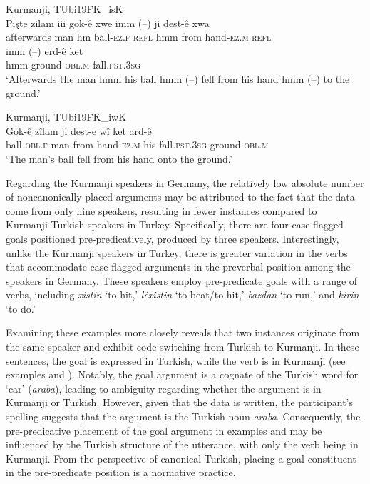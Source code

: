 \ea \label{ex:key:62} Kurmanji, TUbi19FK\_isK \\
\gll Pişte    zilam   iii   gok-ê    xwe imm (--)   ji   dest-ê     xwa\\
afterwards  man  hm  ball-\textsc{ez.f}  \textsc{refl}  hmm  {} from  hand\textsc{-ez.m}  \textsc{refl} \\
\gll imm (--)   erd-ê       ket \\
hmm   {} ground-\textsc{obl.m}    fall.\textsc{pst.3sg}\\
\glt ‘Afterwards the man hmm his ball hmm (--) fell from his hand hmm (--) to the ground.’ 
\z


\ea
  \label{ex:key:63} Kurmanji, TUbi19FK\_iwK \\
\gll Gok-ê     zîlam   ji   dest-e    wî   ket     ard-ê \\
ball-\textsc{obl.f}  man  from  hand\textsc{-ez.m}  his  fall.\textsc{pst.3sg}  ground-\textsc{obl.m}\\
\glt ‘The man's ball fell from his hand onto the ground.’ 
  \z

Regarding the Kurmanji speakers in Germany, the relatively low absolute number of noncanonically placed arguments may be attributed to the fact that the data come from only nine speakers, resulting in fewer instances compared to Kurmanji-Turkish speakers in Turkey. Specifically, there are four case-flagged goals positioned pre-predicatively, produced by three speakers. Interestingly, unlike the Kurmanji speakers in Turkey, there is greater variation in the verbs that accommodate case-flagged arguments in the preverbal position among the speakers in Germany. These speakers employ pre-predicate goals with a range of verbs, including \textit{xistin} ‘to hit,’ \textit{lêxistin} ‘to beat/to hit,’ \textit{bazdan} ‘to run,’ and \textit{kirin} ‘to do.’

Examining these examples more closely reveals that two instances originate from the same speaker and exhibit code-switching from Turkish to Kurmanji. In these sentences, the goal is expressed in Turkish, while the verb is in Kurmanji (see examples  and ). Notably, the goal argument is a cognate of the Turkish word for ‘car’ (\textit{araba}), leading to ambiguity regarding whether the argument is in Kurmanji or Turkish. However, given that the data is written, the participant’s spelling suggests that the argument is the Turkish noun \textit{araba}. Consequently, the pre-predicative placement of the goal argument in examples  and  may be influenced by the Turkish structure of the utterance, with only the verb being in Kurmanji. From the perspective of canonical Turkish, placing a goal constituent in the pre-predicate position is a normative practice.

